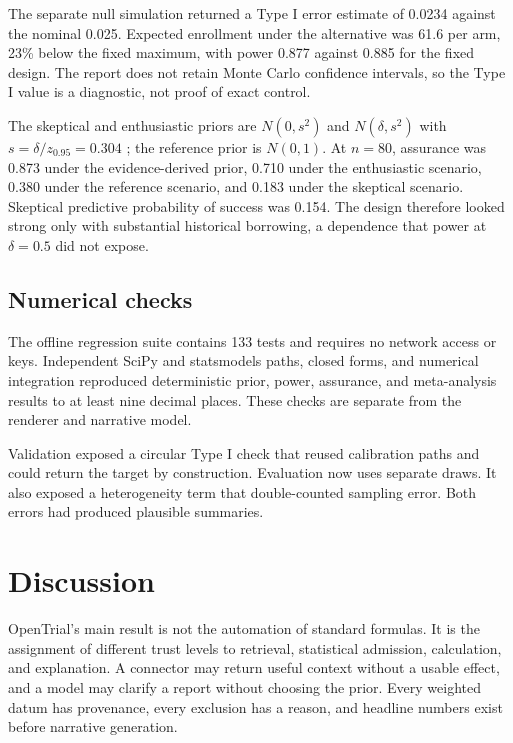 \documentclass{article}
\begin{document}
The separate null simulation returned a Type I error estimate of 0.0234 against the nominal 0.025. Expected enrollment under the alternative was 61.6 per arm, 23\% below the fixed maximum, with power 0.877 against 0.885 for the fixed design. The report does not retain Monte Carlo confidence intervals, so the Type I value is a diagnostic, not proof of exact control.

The skeptical and enthusiastic priors are \(N(0,s^2)\) and \(N(\delta,s^2)\) with \(s=\delta/z_{0.95}=0.304\) \citep{spiegelhalter2004}; the reference prior is \(N(0,1)\). At \(n=80\), assurance was 0.873 under the evidence-derived prior, 0.710 under the enthusiastic scenario, 0.380 under the reference scenario, and 0.183 under the skeptical scenario. Skeptical predictive probability of success was 0.154. The design therefore looked strong only with substantial historical borrowing, a dependence that power at \(\delta=0.5\) did not expose.

\subsection{Numerical checks}

The offline regression suite contains 133 tests and requires no network access or keys. Independent SciPy and statsmodels paths, closed forms, and numerical integration reproduced deterministic prior, power, assurance, and meta-analysis results to at least nine decimal places. These checks are separate from the renderer and narrative model.

Validation exposed a circular Type I check that reused calibration paths and could return the target by construction. Evaluation now uses separate draws. It also exposed a heterogeneity term that double-counted sampling error. Both errors had produced plausible summaries.

\section{Discussion}

OpenTrial's main result is not the automation of standard formulas. It is the assignment of different trust levels to retrieval, statistical admission, calculation, and explanation. A connector may return useful context without a usable effect, and a model may clarify a report without choosing the prior. Every weighted datum has provenance, every exclusion has a reason, and headline numbers exist before narrative generation.
\end{document}
